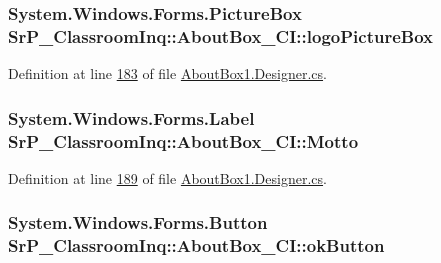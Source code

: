 \hypertarget{class_sr_p___classroom_inq_1_1_about_box___c_i_abc53ccfd3fe852b430d0542030f8ebf4}{
\subsubsection[{logo\-Picture\-Box}]{\setlength{\rightskip}{0pt plus 5cm}\-System.\-Windows.\-Forms.\-Picture\-Box {\bf \-Sr\-P\-\_\-\-Classroom\-Inq\-::\-About\-Box\-\_\-\-C\-I\-::logo\-Picture\-Box}}}
\label{class_sr_p___classroom_inq_1_1_about_box___c_i_abc53ccfd3fe852b430d0542030f8ebf4}


\-Definition at line \hyperlink{_about_box1_8_designer_8cs_source_l00183}{183} of file \hyperlink{_about_box1_8_designer_8cs_source}{\-About\-Box1.\-Designer.\-cs}.

\hypertarget{class_sr_p___classroom_inq_1_1_about_box___c_i_a9e0b3276b452249890107b395c953e57}{
\subsubsection[{\-Motto}]{\setlength{\rightskip}{0pt plus 5cm}\-System.\-Windows.\-Forms.\-Label {\bf \-Sr\-P\-\_\-\-Classroom\-Inq\-::\-About\-Box\-\_\-\-C\-I\-::\-Motto}}}
\label{class_sr_p___classroom_inq_1_1_about_box___c_i_a9e0b3276b452249890107b395c953e57}


\-Definition at line \hyperlink{_about_box1_8_designer_8cs_source_l00189}{189} of file \hyperlink{_about_box1_8_designer_8cs_source}{\-About\-Box1.\-Designer.\-cs}.

\hypertarget{class_sr_p___classroom_inq_1_1_about_box___c_i_a1fba7bba76046a6ef3254d7f02cd88bb}{
\subsubsection[{ok\-Button}]{\setlength{\rightskip}{0pt plus 5cm}\-System.\-Windows.\-Forms.\-Button {\bf \-Sr\-P\-\_\-\-Classroom\-Inq\-::\-About\-Box\-\_\-\-C\-I\-::ok\-Button}}}
\label{class_sr_p___classroom_inq_1_1_about_box___c_i_a1fba7bba76046a6ef3254d7f02cd88bb}


